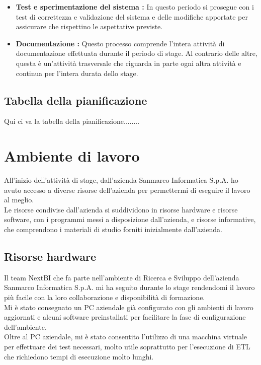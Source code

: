 \begin{itemize}
\item \textbf{Test e sperimentazione del sistema :}
In questo periodo si prosegue con i test di correttezza e validazione del sistema e delle modifiche apportate per assicurare che rispettino le aspettative previste.

\item \textbf{Documentazione :} 
Questo  processo comprende l'intera attività di documentazione effettuata durante il periodo di stage. Al contrario delle altre, questa è un'attività trasversale che riguarda in parte ogni altra attività e continua per l'intera durata dello stage. 
\end{itemize}

\subsection{Tabella della pianificazione}



Qui ci va la tabella della pianificazione........


\section{Ambiente di lavoro}

All'inizio dell'attività di stage, dall'azienda Sanmarco Informatica S.p.A. ho avuto accesso a diverse risorse dell'azienda per permettermi di eseguire il lavoro al meglio. \\
Le risorse condivise dall'azienda si suddividono in risorse hardware e risorse software, con i programmi messi a disposizione dall'azienda, e risorse informative, che comprendono i materiali di studio forniti inizialmente dall'azienda. 

\subsection{Risorse hardware}

Il team NextBI che fa parte nell'ambiente di Ricerca e Sviluppo dell'azienda Sanmarco Informatica S.p.A. mi ha seguito durante lo stage rendendomi il lavoro più facile con la loro collaborazione e disponibilità di formazione. \\

Mi è stato consegnato un PC aziendale già configurato con gli ambienti di lavoro aggiornati e alcuni software preinstallati per facilitare la fase di configurazione dell'ambiente. \\
Oltre al PC aziendale, mi è stato consentito l'utilizzo di una macchina virtuale per effettuare dei test necessari, molto utile soprattutto per l'esecuzione di ETL che richiedono tempi di esecuzione molto lunghi. 
